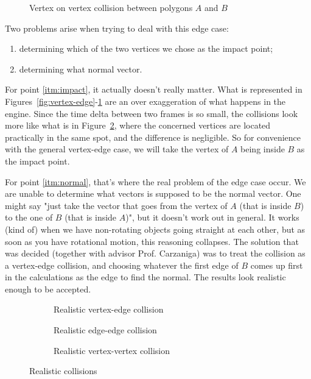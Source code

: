 \begin{figure}[H]
	\centering
	\caption{Vertex on vertex collision between polygons $A$ and $B$}
	\label{fig:vertex-vertex}
\end{figure}

\noindent
Two problems arise when trying to deal with this edge case:
\begin{enumerate}
	\item determining which of the two vertices we chose as the impact point;
	      \label{itm:impact}
	\item determining what normal vector.
	      \label{itm:normal}
\end{enumerate}

For point \ref{itm:impact}, it actually doesn't really matter. What is
represented in Figures~\ref{fig:vertex-edge}-\ref{fig:vertex-vertex} are an
over exaggeration of what happens in the engine. Since the time delta between
two frames is so small, the collisions look more like what is in
Figure~\ref{fig:real-vertex-vertex}, where the concerned vertices are located
practically in the same spot, and the difference is negligible. So for convenience
with the general vertex-edge case, we will take the vertex of $A$ being inside
$B$ as the impact point.

For point \ref{itm:normal}, that's where the real problem of the edge case
occur. We are unable to determine what vectors is supposed to be the normal
vector. One might say "just take the vector that goes from the vertex of $A$
(that is inside $B$) to the one of $B$ (that is inside $A$)", but it doesn't
work out in general. It works (kind of) when we have non-rotating objects going
straight at each other, but as soon as you have rotational motion, this
reasoning collapses. The solution that was decided (together with advisor Prof.
Carzaniga) was to treat the collision as a vertex-edge collision, and choosing
whatever the first edge of $B$ comes up first in the calculations as the edge to
find the normal. The results look realistic enough to be accepted.


\begin{figure}[H]
	\centering
	\begin{subfigure}[]{.33\textwidth}
		\centering
		\caption{Realistic vertex-edge collision}
	\end{subfigure}
	\begin{subfigure}[]{.32\textwidth}
		\centering
		\caption{Realistic edge-edge collision}
	\end{subfigure}
	\begin{subfigure}[]{.34\textwidth}
		\centering
		\caption{Realistic vertex-vertex collision}
		\label{fig:real-vertex-vertex}
	\end{subfigure}
	\caption{Realistic collisions}
	\label{fig:real-collisions}
\end{figure}

